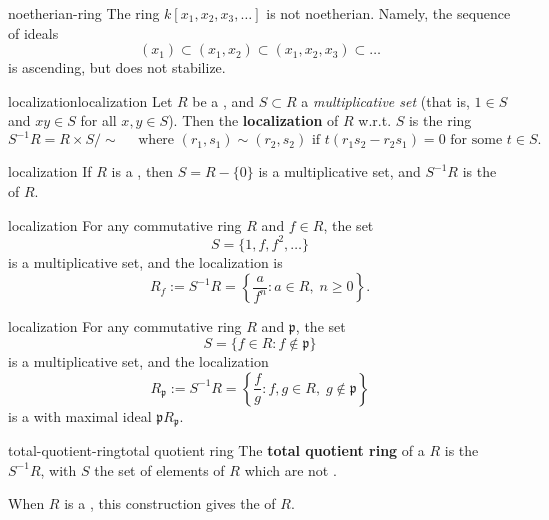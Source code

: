 \begin{example}{noetherian-ring}
    The ring $k[x_1, x_2, x_3, \ldots]$ is not noetherian. Namely, the sequence of ideals
    \[ (x_1) \subset (x_1, x_2) \subset (x_1, x_2, x_3) \subset \ldots \]
    is ascending, but does not stabilize.
\end{example}

\begin{topic}{localization}{localization}
    Let $R$ be a , and $S \subset R$ a \textit{multiplicative set} (that is, $1 \in S$ and $xy \in S$ for all $x, y \in S$). Then the \textbf{localization} of $R$ w.r.t. $S$ is the ring
    \[ S^{-1} R = R \times S / \sim{} \quad \text{ where } (r_1, s_1) \sim{} (r_2, s_2) \text{ if } t(r_1 s_2 - r_2 s_1) = 0 \text{ for some } t \in S . \]
\end{topic}

\begin{example}{localization}
    If $R$ is a , then $S = R - \{ 0 \}$ is a multiplicative set, and $S^{-1} R$ is the  of $R$.
\end{example}

\begin{example}{localization}
    For any commutative ring $R$ and $f \in R$, the set
    \[ S = \{ 1, f, f^2, \ldots \} \]
    is a multiplicative set, and the localization is
    \[ R_f := S^{-1} R = \left\{ \frac{a}{f^n} : a \in R, \; n \ge 0 \right\} . \]
\end{example}

\begin{example}{localization}
    For any commutative ring $R$ and  $\mathfrak{p}$, the set
    \[ S = \{ f \in R : f \not\in \mathfrak{p} \} \]
    is a multiplicative set, and the localization
    \[ R_\mathfrak{p} := S^{-1} R = \left\{ \frac{f}{g} : f, g \in R, \; g \not\in \mathfrak{p} \right\} \]
    is a  with maximal ideal $\mathfrak{p} R_\mathfrak{p}$.
\end{example}

\begin{topic}{total-quotient-ring}{total quotient ring}
    The \textbf{total quotient ring} of a  $R$ is the  $S^{-1} R$, with $S$ the set of elements of $R$ which are not .
    
    When $R$ is a , this construction gives the  of $R$.
\end{topic}

